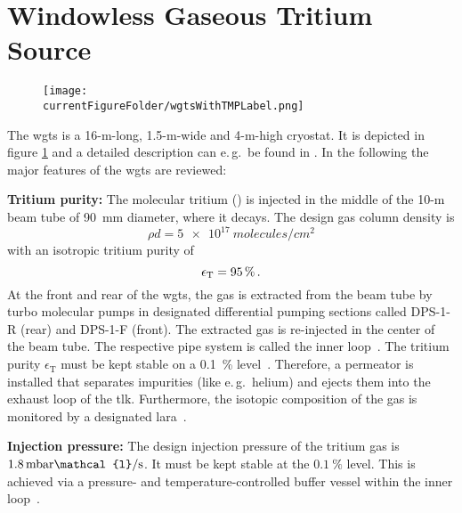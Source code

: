\section{Windowless Gaseous Tritium Source}
\label{sec:katrinExpSetupWGTS}
\begin{figure}
    \centering    \texttt{[image: \\currentFigureFolder/wgtsWithTMPLabel.png]}
    \label{fig:katrinExpSetupWGTS}
\end{figure}%
The \gls{wgts} is a 16-m-long, 1.5-m-wide and 4-m-high cryostat. It is depicted in figure \ref{fig:katrinExpSetupWGTS} and a detailed description can e.\,g.~be found in \cite{Grohman2008}. In the following the major features of the \gls{wgts} are reviewed:

{\par\textbf{Tritium purity:} 
The molecular tritium () is injected in the middle of the 10-m beam tube of \SI{90}{mm} diameter, where it decays. The design gas column density is 
\begin{equation}
    \label{eq:columnDensity}
    \rho d = \SI{5e17}{molecules/{cm}^2}
\end{equation}
with an isotropic tritium purity of
\begin{equation}
    \epsilon_\text{T} = \SI{95}{\percent}
    \text{\,.}
\end{equation}
At the front and rear of the \gls{wgts}, the gas is extracted from the beam tube by turbo molecular pumps in designated differential pumping sections called DPS-1-R (rear) and DPS-1-F (front). The extracted gas is re-injected in the center of the beam tube. The respective pipe system is called the inner loop~\cite{PRIESTER201542}. The tritium purity $\epsilon_\text{T}$ must be kept stable on a \SI{0.1}{\percent} level~\cite{Angrik:2005ep}. Therefore, a permeator is installed that separates impurities (like e.\,g.~helium) and ejects them into the exhaust loop of the \gls{tlk}. Furthermore, the isotopic composition of the gas
is monitored by a designated \gls{lara}~\cite{Schloesser2013}.}

{\par\textbf{Injection pressure:}
The design injection pressure of the tritium gas is $1.8\text{\,mbar}\mathcal{l}/\text{s}$. It must be kept stable at the $\SI{0.1}{\percent}$ level. This is achieved via a pressure- and temperature-controlled buffer vessel within the inner loop~\cite{PRIESTER201542}.}

